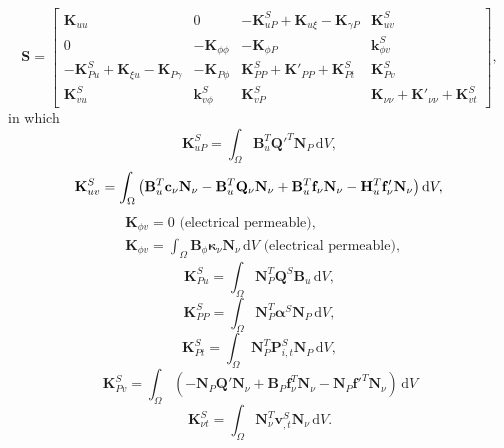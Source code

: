 \begin{equation}
    \mathbf{S}=\begin{bmatrix}
        \mathbf{K}_{uu} & 0 & -\mathbf{K}_{uP}^S+\mathbf{K}_{u\xi}-\mathbf{K}_{\gamma P} & \mathbf{K}_{uv}^S \\
        0 & -\mathbf{K}_{\phi\phi} & -\mathbf{K}_{\phi P} & {\mathbf{k}_{\phi v}^S} \\
        -\mathbf{K}_{Pu}^S+\mathbf{K}_{\xi u}-\mathbf{K}_{P \gamma} & -\mathbf{K}_{P\phi } & \mathbf{K}_{PP}^S+\mathbf{K}'_{PP}+\mathbf{K}_{Pt}^S & \mathbf{K}_{Pv}^S \\
        \mathbf{K}_{vu}^S & {\mathbf{k}_{v\phi}^S} & \mathbf{K}_{vP}^S & \mathbf{K}_{\nu\nu}+\mathbf{K}'_{\nu\nu}+\mathbf{K}_{vt}^S
    \end{bmatrix},
\end{equation}
in which 
\begin{equation}
    \mathbf{K}_{uP}^S=\int_\Omega \mathbf{B}_u^T \mathbf{Q}'^T \mathbf{N}_P\, \text{d}V,
\end{equation}
\begin{equation}
    \mathbf{K}_{uv}^S=\int_\Omega\left(\mathbf{B}_u^T\mathbf{c}_\nu\mathbf{N}_\nu-\mathbf{B}_u^T\mathbf{Q}_\nu\mathbf{N}_\nu+\mathbf{B}_u^T\mathbf{f}_\nu\mathbf{N}_\nu-\mathbf{H}_u^T\mathbf{f}_\nu'\mathbf{N}_\nu\right)\mathrm{d}V,\\
\end{equation}
\begin{equation}
    \begin{split}
    &{\mathbf{K}_{\phi v}}=0 \text{ (electrical permeable)},\;\\
    &{\mathbf{K}_{\phi v}}=\int_\Omega \mathbf{B}_\phi \mathbf{\kappa}_\nu \mathbf{N}_\nu\, \text{d}V \text{ (electrical permeable)},\;
\end{split}
\end{equation}
\begin{equation}
    \mathbf{K}_{Pu}^S=\int_\Omega \mathbf{N}_P^T \mathbf{Q}^S\mathbf{B}_u \, \text{d}V,
\end{equation}
\begin{equation}
    \mathbf{K}_{PP}^S=\int_\Omega \mathbf{N}_P^T \mathbf{\alpha}^S \mathbf{N}_P\, \text{d}V,
\end{equation}
\begin{equation}
    \mathbf{K}_{Pt}^S=\int_\Omega \mathbf{N}_P^T \mathbf{P}_{i,t}^S \mathbf{N}_P\, \text{d}V,
\end{equation}
\begin{equation}
    \mathbf{K}_{Pv}^S=\int_\Omega (-\mathbf{N}_P \mathbf{Q}'\mathbf{N}_\nu+\mathbf{B}_P\mathbf{f}_\nu^T\mathbf{N}_\nu-\mathbf{N}_P\mathbf{f}'^T\mathbf{N}_\nu)\, \text{d}V
\end{equation}
\begin{equation}
    \mathbf{K}_{\nu t}^S=\int_\Omega \mathbf{N}_\nu^T \mathbf{v}_{,t}^S \mathbf{N}_\nu\, \text{d}V.
\end{equation}


